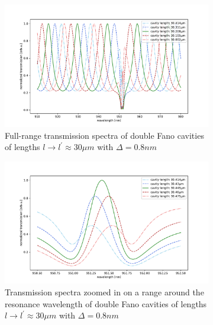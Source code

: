\begin{figure}[h!]
    \centering
    \begin{subfigure}[b]{0.49\textwidth}
        \includegraphics[width=\textwidth]{figures/large_detuning_length_scan_long.pdf}
        \caption{Full-range transmission spectra of double Fano cavities of lengths $l \rightarrow l^{\prime} \approx 30 \mu m$ with $\Delta = 0.8nm$}
        \label{fig:detuned_large_length_scan_long}
    \end{subfigure}
    \begin{subfigure}[b]{0.49\textwidth}
        \includegraphics[width=\textwidth]{figures/large_detuning_length_scan_short.pdf}
        \caption{Transmission spectra zoomed in on a range around the resonance wavelength of double Fano cavities of lengths $l \rightarrow l^{\prime} \approx 30 \mu m$ with $\Delta = 0.8nm$}
        \label{fig:detuned_large_length_scan_short}
    \end{subfigure}
    \caption{}
    \label{fig:large_detuning_length_scans}
\end{figure}

